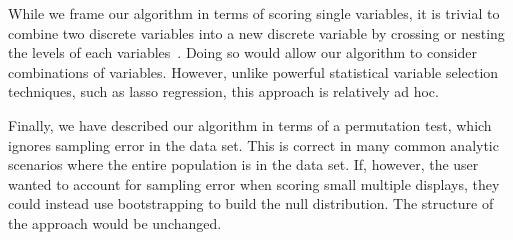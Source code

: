 While we frame our algorithm in terms of scoring single variables, it is trivial to combine two discrete variables into a new discrete variable by crossing or nesting the levels of each variables~\cite{Wilkinson2005GG,Stolte2002}. Doing so would allow our algorithm to consider combinations of variables. However, unlike powerful statistical variable selection techniques, such as lasso regression, this approach is relatively ad hoc.

Finally, we have described our algorithm in terms of a permutation test, which ignores sampling error in the data set. This is correct in many common analytic scenarios where the entire population is in the data set. If, however, the user wanted to account for sampling error when scoring small multiple displays, they could instead use bootstrapping to build the null distribution. The structure of the approach would be unchanged.


